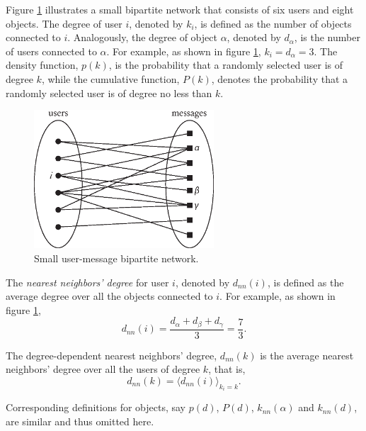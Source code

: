       Figure \ref{fig:cs_network} illustrates a small bipartite network that consists of six users and eight objects. The degree of user $i$, denoted by $k_i$, is defined as the number of objects connected to $i$. Analogously, the degree of object $\alpha$, denoted by $d_\alpha$, is the number of users connected to $\alpha$. For example, as shown in figure \ref{fig:cs_network}, $k_i = d_\alpha = 3$. The density function, $p(k)$, is the probability that a randomly selected user is of degree $k$, while the cumulative function, $P(k)$, denotes the probability that a randomly selected user is of degree no less than $k$.
      \begin{figure}[h]
        \centering
        \includegraphics[width=0.6\textwidth]{chapters/03_implementation/cs_network}
        \caption{Small user-message bipartite network.}
        \label{fig:cs_network}
      \end{figure}
      
      The \emph{nearest neighbors’ degree} for user $i$, denoted by $d_{nn}(i)$, is defined as the average degree over all the objects connected to $i$. For example, as shown in figure \ref{fig:cs_network},
      \begin{equation}
        d_{nn}(i) = \frac{d_\alpha + d_\beta + d_\gamma}{3} = \frac{7}{3}\mbox{.}
      \end{equation}

      The degree-dependent nearest neighbors’ degree, $d_{nn}(k)$ is the average nearest neighbors’ degree over all the users of degree $k$, that is,
      \begin{equation}
        d_{nn}(k) = \langle d_{nn}(i) \rangle_{k_i=k}\mbox{.}
      \end{equation}

      Corresponding definitions for objects, say $p(d)$, $P(d)$, $k_{nn}(\alpha)$ and $k_{nn}(d)$, are similar and thus omitted here.
      
